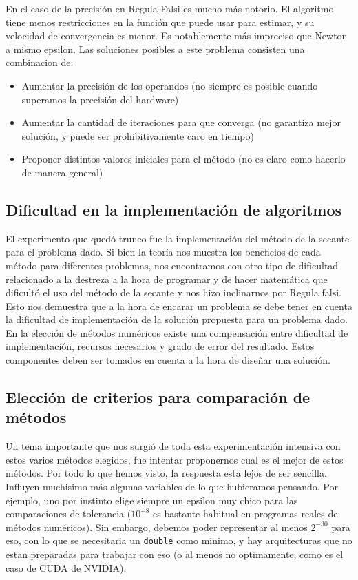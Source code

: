 En el caso de la precisi\'on en Regula Falsi es mucho m\'as notorio. El 
algoritmo tiene menos restricciones en la funci\'on que puede usar para estimar, 
y su velocidad de convergencia es menor. Es notablemente m\'as impreciso
que Newton a mismo epsilon. Las soluciones posibles a este problema consisten 
una combinacion de: 
\begin{itemize}
    \item Aumentar la precisi\'on de los operandos (no siempre es posible 
cuando superamos la precisi\'on del hardware)
    \item Aumentar la cantidad de iteraciones para que converga (no garantiza 
mejor soluci\'on, y puede ser prohibitivamente caro en tiempo)
    \item Proponer distintos valores iniciales para el m\'etodo (no es claro 
como hacerlo de manera general)
\end{itemize}

\subsection{Dificultad en la implementaci\'on de algoritmos}

El experimento que qued\'o trunco fue la implementaci\'on del m\'etodo de la 
secante para el problema dado. 
Si bien la teor\'ia nos muestra los beneficios de cada m\'etodo para diferentes 
problemas, nos encontramos con otro 
tipo de dificultad relacionado a la destreza a la hora de programar y de hacer 
matem\'atica que dificult\'o el uso 
del m\'etodo de la secante y nos hizo inclinarnos por Regula falsi. Esto nos 
demuestra que a la hora de encarar un 
problema se debe tener en cuenta la dificultad de implementaci\'on de la 
soluci\'on propuesta para un problema dado. 
En la elecci\'on de m\'etodos num\'ericos existe una compensaci\'on entre 
dificultad de implementaci\'on, recursos necesarios 
y grado de error del resultado. Estos componentes deben ser tomados en cuenta a 
la hora de dise\~nar una soluci\'on.

\subsection{Elecci\'on de criterios para comparaci\'on de m\'etodos}

Un tema importante que nos surgi\'o de toda esta experimentaci\'on intensiva
con estos varios m\'etodos elegidos, fue intentar proponernos cual es el mejor
de estos m\'etodos. Por todo lo que hemos visto, la respuesta esta lejos de
ser sencilla. Influyen muchisimo m\'as algunas variables de lo que hubieramos
pensando. Por ejemplo, uno por instinto elige siempre un epsilon muy chico
para las comparaciones de tolerancia ($10^{-8}$ es bastante habitual en programas
reales de m\'etodos num\'ericos). Sin embargo, debemos poder representar al 
menos $2^{-30}$ para eso, con lo que se necesitaria un \texttt{double} como minimo,
y hay arquitecturas que no estan preparadas para trabajar con eso (o al menos 
no optimamente, como es el caso de CUDA de NVIDIA). 

